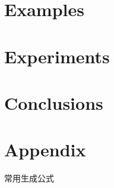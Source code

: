\documentclass[12pt,a4paper,UTF8]{article}
\numberwithin{equation}{section}
\begin{document}
\section{Examples}\label{example}

\section{Experiments}\label{experiment}

\section{Conclusions}\label{conclusion}

\newpage 
\section*{Appendix}
常用生成公式
\end{document}
